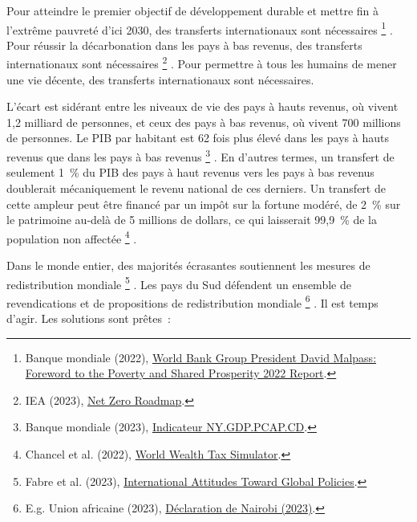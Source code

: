 \documentclass[a5paper,french]{memoir}
\begin{document}
Pour atteindre le premier objectif de développement durable et mettre fin à l'extrême pauvreté d'ici 2030, des transferts internationaux sont nécessaires
\footnote{Banque mondiale (2022), \href{https://www.worldbank.org/en/news/statement/2022/10/05/world-bank-group-president-david-malpass-foreword-to-the-poverty-and-shared-prosperity-report}{World Bank Group President David Malpass: Foreword to the Poverty and Shared Prosperity 2022 Report}.}%
. Pour réussir la décarbonation dans les pays à bas revenus, des transferts internationaux sont nécessaires
\footnote{IEA (2023), \href{https://www.iea.org/reports/net-zero-roadmap-a-global-pathway-to-keep-the-15-0c-goal-in-reach/}{Net Zero Roadmap}.}%
. Pour permettre à tous les humains de mener une vie décente, des transferts internationaux sont nécessaires. 

L'écart est sidérant entre les niveaux de vie des pays à hauts revenus, où vivent 1,2 milliard de personnes, et ceux des pays à bas revenus, où vivent 700 millions de personnes. Le PIB par habitant est 62 fois plus élevé dans les pays à hauts revenus que dans les pays à bas revenus
\footnote{Banque mondiale (2023), \href{https://data.worldbank.org/indicator/NY.GDP.PCAP.CD?end=2021\&locations=EU-ZG-XD-XM-1W-IN-US-CD-BI-LU-CN\&start=2021\&view=bar}{Indicateur NY.GDP.PCAP.CD}.}%
. En d'autres termes, un transfert de seulement 1~\% du PIB des pays à haut revenus vers les pays à bas revenus doublerait mécaniquement le revenu national de ces derniers. Un transfert de cette ampleur peut être financé par un impôt sur la fortune modéré, de 2~\% sur le patrimoine au-delà de 5 millions de dollars, ce qui laisserait 99,9~\% de la population non affectée
\footnote{Chancel et al. (2022), \href{https://wid.world/world-wealth-tax-simulator/}{World Wealth Tax Simulator}.}%
.

Dans le monde entier, des majorités écrasantes soutiennent les mesures de redistribution mondiale
\footnote{Fabre et al. (2023), \href{https://papers.ssrn.com/sol3/papers.cfm?abstract\_id=4448523}{International Attitudes Toward Global Policies}.}%
. Les pays du Sud défendent un ensemble de revendications et de propositions de redistribution mondiale
\footnote{E.g. Union africaine (2023), \href{https://media.africaclimatesummit.org/NAIROBI+Declaration+FURTHER+edited+060923+EN+920AM.pdf}{Déclaration de Nairobi (2023)}.}%
. Il est temps d'agir. Les solutions sont prêtes~:
\end{document}
